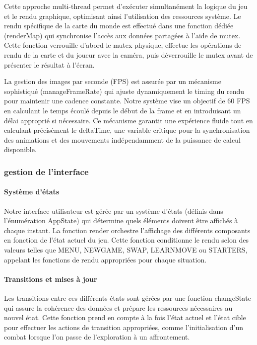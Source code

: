 \documentclass[12pt,a4paper, twoside]{article}
\begin{document}
Cette approche multi-thread permet d'exécuter simultanément la logique du jeu et le rendu graphique, optimisant ainsi l'utilisation des ressources système. Le rendu spécifique de la carte du monde est effectué dans une fonction dédiée (renderMap) qui synchronise l'accès aux données partagées à l'aide de mutex. Cette fonction verrouille d'abord le mutex physique, effectue les opérations de rendu de la carte et du joueur avec la caméra, puis déverrouille le mutex avant de présenter le résultat à l'écran.

La gestion des images par seconde (FPS) est assurée par un mécanisme sophistiqué (manageFrameRate) qui ajuste dynamiquement le timing du rendu pour maintenir une cadence constante. Notre système vise un objectif de 60 FPS en calculant le temps écoulé depuis le début de la frame et en introduisant un délai approprié si nécessaire. Ce mécanisme garantit une expérience fluide tout en calculant précisément le deltaTime, une variable critique pour la synchronisation des animations et des mouvements indépendamment de la puissance de calcul disponible.

\subsubsection{gestion de l'interface}
\paragraph{Système d'états} Notre interface utilisateur est gérée par un système d'états (définis dans l'énumération AppState) qui détermine quels éléments doivent être affichés à chaque instant. La fonction render orchestre l'affichage des différents composants en fonction de l'état actuel du jeu. Cette fonction conditionne le rendu selon des valeurs telles que MENU, NEWGAME, SWAP, LEARNMOVE ou STARTERS, appelant les fonctions de rendu appropriées pour chaque situation.

\paragraph{Transitions et mises à jour} Les transitions entre ces différents états sont gérées par une fonction changeState qui assure la cohérence des données et prépare les ressources nécessaires au nouvel état. Cette fonction prend en compte à la fois l'état actuel et l'état cible pour effectuer les actions de transition appropriées, comme l'initialisation d'un combat lorsque l'on passe de l'exploration à un affrontement.
\end{document}
